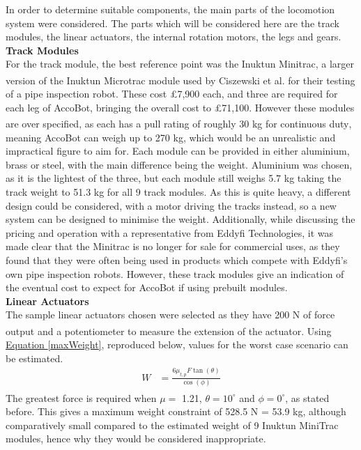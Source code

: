 \documentclass[11pt]{article}		%
\newcommand{\supercite}[1]{\textsuperscript{\cite{#1}}}		%
\newcommand{\equationref}[1]{\hyperref[#1]{Equation \ref*{#1}}}     %
\begin{document}
			In order to determine suitable components, the main parts of the locomotion system were considered.
			The parts which will be considered here are the track modules, the linear actuators, the internal rotation motors, the legs and gears.
			\\
			\textbf{Track Modules}
			\\
			For the track module, the best reference point was the Inuktun Minitrac, a larger version of the Inuktun Microtrac module used by Ciszewski et al.\supercite{ciszewski2015design} for their testing of a pipe inspection robot.
			These cost £7,900 each, and three are required for each leg of AccoBot, bringing the overall cost to £71,100.
			However these modules are over specified, as each has a pull rating of roughly 30 kg for continuous duty\supercite{inuktunTracks}, meaning AccoBot can weigh up to 270 kg, which would be an unrealistic and impractical figure to aim for.
			Each module can be provided in either aluminium, brass or steel, with the main difference being the weight.
			Aluminium was chosen, as it is the lightest of the three, but each module still weighs 5.7 kg taking the track weight to 51.3 kg for all 9 track modules.
			As this is quite heavy, a different design could be considered, with a motor driving the tracks instead, so a new system can be designed to minimise the weight.
			Additionally, while discussing the pricing and operation with a representative from Eddyfi Technologies, it was made clear that the Minitrac is no longer for sale for commercial uses, as they found that they were often being used in products which compete with Eddyfi's own pipe inspection robots.
			However, these track modules give an indication of the eventual cost to expect for AccoBot if using prebuilt modules.
			\\
			\textbf{Linear Actuators}
			\\
			The sample linear actuators chosen were selected as they have 200 N of force output and a potentiometer to measure the extension of the actuator\supercite{rsproLinear}.
			Using \equationref{maxWeight}, reproduced below, values for the worst case scenario can be estimated.
			\begin{align*}
				W &= \frac{6 \mu_{t,p} F \tan \left( \theta \right)}{\cos \left( \phi \right)}
			\end{align*}
			The greatest force is required when $\mu =$ 1.21\supercite{sato2011development}, $\theta = 10^\circ$ and $\phi = 0^\circ$, as stated before.
			This gives a maximum weight constraint of 528.5 N = 53.9 kg, although comparatively small compared to the estimated weight of 9 Inuktun MiniTrac modules, hence why they would be considered inappropriate.
\end{document}
